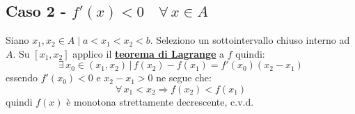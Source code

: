 \documentclass[../../dimostrazioni]{subfiles}
\begin{document}
            \subsection*{Caso 2 - \( f'(x) < 0 \quad \forall \, x \in A \)}

            Siano \(x_1, x_2 \in A \mid a < x_1 < x_2 < b \). Seleziono un sottointervallo chiuso interno ad \(A\).
            Su \( [x_1, x_2] \) applico il \textbf{\hyperref[teoLagrange]{teorema di Lagrange}} a \(f\) quindi:
            \[
                \exists \, x_0 \in (x_1, x_2) \, | \, f(x_2) - f(x_1) = f'(x_0)(x_2 - x_1) 
            \]
            essendo \( f'(x_0) < 0 \) e \( x_2 - x_1 > 0 \) ne segue che:
            \[
                \forall \, x_1 < x_2 \Rightarrow f(x_2) < f(x_1)
            \]
            quindi \(f(x)\) è monotona strettamente decrescente, c.v.d.
    
    
\end{document}
